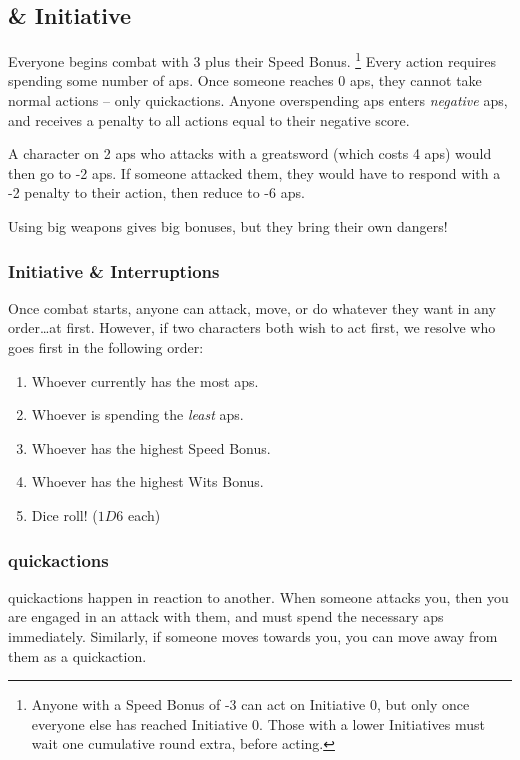\begin{multicols}{2}
\subsection{ \& Initiative}

Everyone begins combat with 3  plus their Speed Bonus.%
\footnote{Anyone with a Speed Bonus of -3 can act on Initiative 0, but only once everyone else has reached Initiative 0.
Those with a lower Initiatives must wait one cumulative round extra, before acting.}
Every action requires spending some number of \glspl{ap}.
Once someone reaches 0 \glspl{ap}, they cannot take normal actions -- only \glspl{quickaction}.
Anyone overspending \glspl{ap} enters \emph{negative} \glspl{ap}, and receives a penalty to all actions equal to their negative score.

A character on 2 \glspl{ap} who attacks with a greatsword (which costs 4 \glspl{ap}) would then go to -2 \glspl{ap}.
If someone attacked them, they would have to respond with a -2 penalty to their action, then reduce to -6 \glspl{ap}.

Using big weapons gives big bonuses, but they bring their own dangers!

\subsubsection{Initiative \& Interruptions}

Once combat starts, anyone can attack, move, or do whatever they want in any order\ldots at first.
However, if two characters both wish to act first, we resolve who goes first in the following order:

\begin{enumerate}
  \item
  Whoever currently has the most \glspl{ap}.
  \item
  Whoever is spending the \emph{least} \glspl{ap}.
  \item
  Whoever has the highest Speed Bonus.
  \item
  Whoever has the highest Wits Bonus.
  \item
  Dice roll! ($1D6$ each)
\end{enumerate}

\subsubsection{\Glspl{quickaction}}

\Glspl{quickaction} happen in reaction to another.
When someone attacks you, then you are engaged in an attack with them, and must spend the necessary \glspl{ap} immediately.
Similarly, if someone moves towards you, you can move away from them as a \gls{quickaction}.


\end{multicols}
